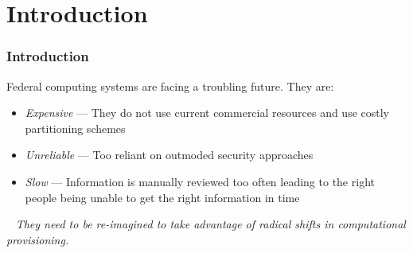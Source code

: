 \section{Introduction}
\begin{frame}
\frametitle{Introduction}
Federal computing systems are facing a troubling future.  They are:
\pause
\begin{itemize}
\item \textit{Expensive} --- They do not use current commercial resources and use costly partitioning schemes
\pause
\item \textit{Unreliable} --- Too reliant on outmoded security approaches
\pause
\item \textit{Slow} --- Information is manually reviewed too often leading to the right people being unable to get the right information in time 
\end{itemize}
\
\newline
\newline
\newline
\pause
\textit{They need to be re-imagined to take advantage of radical shifts in computational provisioning.}
\end{frame}